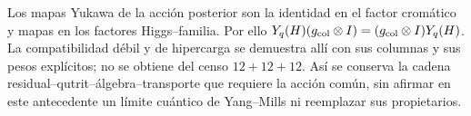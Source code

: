 Los mapas Yukawa de la acción posterior son la identidad en el
factor cromático y mapas en los factores Higgs--familia. Por ello
\(Y_q(H)(g_{\rm col}\otimes I)
=(g_{\rm col}\otimes I)Y_q(H)\). La compatibilidad débil y de
hipercarga se demuestra allí con sus columnas y sus pesos explícitos;
no se obtiene del censo \(12+12+12\).
Así se conserva la cadena residual--qutrit--álgebra--transporte
que requiere la acción común, sin afirmar en este antecedente un
límite cuántico de Yang--Mills ni reemplazar sus propietarios.
